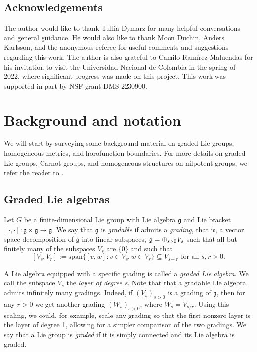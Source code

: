 \documentclass{article}
\theoremstyle{definition}
\newcommand{\g}{\mathfrak g}
\newcommand{\Span}{\mathrm{span}}
\begin{document}
\subsection*{Acknowledgements}

The author would like to thank Tullia Dymarz for many helpful conversations and general guidance. He would also like to thank Moon Duchin, Anders Karlsson, and the anonymous referee for useful comments and suggestions regarding this work. The author is also grateful to Camilo Ramírez Maluendas for his invitation to visit the Universidad Nacional de Colombia in the spring of 2022, where significant progress was made on this project. This work was supported in part by NSF grant DMS-2230900.



\section{Background and notation}

We will start by surveying some background material on graded Lie groups, homogeneous metrics, and horofunction boundaries. For more details on graded Lie groups, Carnot groups, and homogeneous structures on nilpotent groups, we refer the reader to \cites{fischer-ruzhansky, ledonne-primer}.



\subsection{Graded Lie algebras}
\label{sec:gradings}

Let $G$ be a finite-dimensional Lie group with Lie algebra $\g$ and Lie bracket $[\cdot,\cdot]:\g\times \g\to \g$. We say that $\g$ is \emph{gradable} if admits a {\em grading}, that is, a vector space decomposition of $\g$ into linear subspaces,
$\g =\mathlarger\oplus_{s>0} V_s$
such that all but finitely many of the subspaces $V_s$ are $\{0\}$ and such that 
\[
[V_s,V_r]:= \Span\{[v,w]:v\in V_s, w\in V_r\}\subseteq V_{s+r} \text{ for all } s, r > 0.
\] 

A Lie algebra equipped with a specific grading is called a {\em graded Lie algebra}. We call the subspace $V_s$ the {\em layer of degree $s$}. Note that that a gradable Lie algebra admits infinitely many gradings. Indeed, if $(V_s)_{s>0}$ is a grading of $\g$, then for any $r>0$ we get another grading $(W_s)_{s>0}$, where $W_s = V_{s/r}$. Using this scaling, we could, for example, scale any grading so that the first nonzero layer is the layer of degree 1, allowing for a simpler comparison of the two gradings.
We say that a Lie group is {\em graded} if it is simply connected and its Lie algebra is graded.
\end{document}
